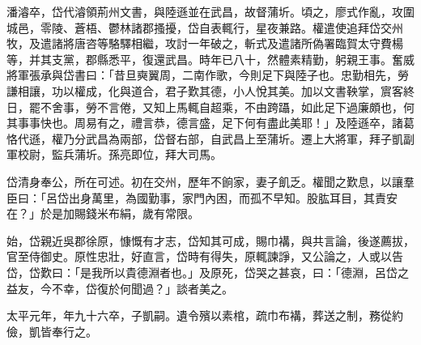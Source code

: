 \begin{pinyinscope}
 
 
 
 潘濬卒，岱代濬領荊州文書，與陸遜並在武昌，故督蒲圻。頃之，廖式作亂，攻圍城邑，零陵、蒼梧、鬱林諸郡搔擾，岱自表輒行，星夜兼路。權遣使追拜岱交州牧，及遣諸將唐咨等駱驛相繼，攻討一年破之，斬式及遣諸所偽署臨賀太守費楊等，并其支黨，郡縣悉平，復還武昌。時年已八十，然體素精勤，躬親王事。奮威將軍張承與岱書曰：「昔旦奭翼周，二南作歌，今則足下與陸子也。忠勤相先，勞謙相讓，功以權成，化與道合，君子歎其德，小人悅其美。加以文書鞅掌，賔客終日，罷不舍事，勞不言倦，又知上馬輒自超乘，不由跨躡，如此足下過廉頗也，何其事事快也。周易有之，禮言恭，德言盛，足下何有盡此美耶！」及陸遜卒，諸葛恪代遜，權乃分武昌為兩部，岱督右部，自武昌上至蒲圻。遷上大將軍，拜子凱副軍校尉，監兵蒲圻。孫亮即位，拜大司馬。
 
 
 
 
 岱清身奉公，所在可述。初在交州，歷年不餉家，妻子飢乏。權聞之歎息，以讓羣臣曰：「呂岱出身萬里，為國勤事，家門內困，而孤不早知。股肱耳目，其責安在？」於是加賜錢米布絹，歲有常限。
 
 
 
 
 始，岱親近吳郡徐原，慷慨有才志，岱知其可成，賜巾褠，與共言論，後遂薦拔，官至侍御史。原性忠壯，好直言，岱時有得失，原輒諫諍，又公論之，人或以告岱，岱歎曰：「是我所以貴德淵者也。」及原死，岱哭之甚哀，曰：「德淵，呂岱之益友，今不幸，岱復於何聞過？」談者美之。
 
 
 
 
 太平元年，年九十六卒，子凱嗣。遺令殯以素棺，疏巾布褠，葬送之制，務從約儉，凱皆奉行之。
 
 
\end{pinyinscope}